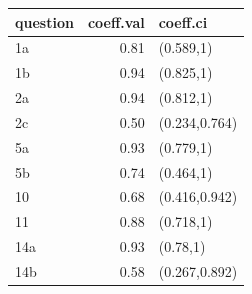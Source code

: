\begin{table}[ht]
\centering
\begin{tabular}{lrl}
 question & coeff.val & coeff.ci \\ 
  \hline
1a & 0.81 & (0.589,1) \\ 
  1b & 0.94 & (0.825,1) \\ 
  2a & 0.94 & (0.812,1) \\ 
  2c & 0.50 & (0.234,0.764) \\ 
  5a & 0.93 & (0.779,1) \\ 
  5b & 0.74 & (0.464,1) \\ 
  10 & 0.68 & (0.416,0.942) \\ 
  11 & 0.88 & (0.718,1) \\ 
  14a & 0.93 & (0.78,1) \\ 
  14b & 0.58 & (0.267,0.892) \\ 
  \end{tabular}
\end{table}
